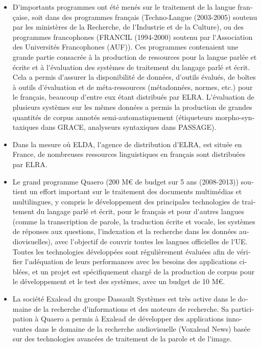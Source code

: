 \documentclass[]{../metanetpaper}
\begin{document}
\begin{french}
\begin{multicols}{2}
\begin{itemize}
\item D{\mbox '}importants programmes ont été menés sur le traitement
  de la langue française, soit dans des programmes français
  (Techno-Langue (2003-2005) soutenu par les ministères de la
  Recherche, de l{\mbox '}Industrie et de la Culture), ou des
  programmes francophones (FRANCIL (1994-2000) soutenu par l{\mbox
    '}Association des Universités Francophones (AUF)). Ces programmes
  contenaient une grande partie consacrée à la production de
  ressources pour la langue parlée et écrite et à l{\mbox '}évaluation
  des systèmes de traitement du langage parlé et écrit. Cela a permis
  d{\mbox '}assurer la disponibilité de données, d{\mbox '}outils
  évalués, de boîtes à outils d{\mbox '}évaluation et de
  méta-ressources (métadonnées, normes, etc.) pour le français,
  beaucoup d{\mbox '}entre eux étant distribués par ELRA. L{\mbox
    '}évaluation de plusieurs systèmes sur les mêmes données a permis
  la production de grandes quantités de corpus annotés
  semi-automatiquement (étiqueteurs morpho-syntaxiques dans GRACE,
  analyseurs syntaxiques dans PASSAGE).

\item Dans la mesure où ELDA, l{\mbox '}agence de distribution d{\mbox '}ELRA, est située en
France, de nombreuses ressources linguistiques en français sont
distribuées par ELRA.

\item Le grand programme Quaero (200 M€ de budget sur 5 ans (2008-2013))
soutient un effort important sur le traitement des documents
multimédias et multilingues, y compris le développement des
principales technologies de traitement du langage parlé et écrit, pour
le français et pour d{\mbox '}autres langues (comme la transcription de
parole, la traduction écrite et vocale, les systèmes de réponses aux
questions, l{\mbox '}indexation et la recherche dans les données
audiovisuelles), avec l{\mbox '}objectif de couvrir toutes les langues
officielles de l{\mbox '}UE. Toutes les technologies développées sont
régulièrement évaluées afin de vérifier l{\mbox '}adéquation de leurs
performances avec les besoins des applications ciblées, et un projet
est spécifiquement chargé de la production de corpus pour le
développement et le test des systèmes, avec un budget de 10 M€.

\item La société Exalead du groupe Dassault Systèmes est très active dans le
domaine de la recherche d{\mbox '}informations et des moteurs de recherche. Sa
participation à Quaero a permis à Exalead de développer des
applications innovantes dans le domaine de la recherche audiovisuelle
(Voxalead News) basée sur des technologies avancées de traitement de
la parole et de l{\mbox '}image.


\end{itemize}
\end{multicols}
\end{french}
\end{document}
